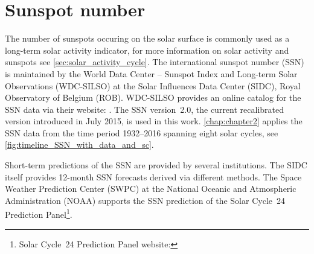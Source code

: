 \section{Sunspot number}
\label{sec:sunspot_number}
The number of sunspots occuring on the solar surface is commonly used as a long-term solar activity indicator, for more information on solar activity and sunspots see \autoref{sec:solar_activity_cycle}. The international sunspot number (SSN) is maintained by the World Data Center -- Sunspot Index and Long-term Solar Observations (WDC-SILSO) at the Solar Influences Data Center (SIDC), Royal Observatory of Belgium (ROB). WDC-SILSO provides an online catalog for the SSN data via their website: . The SSN version~2.0, the current recalibrated version introduced in July 2015, is used in this work. \autoref{chap:chapter2} applies the SSN data from the time period 1932--2016 spanning eight solar cycles, see \autoref{fig:timeline_SSN_with_data_and_sc}.

Short-term predictions of the SSN are provided by several institutions. The SIDC itself provides 12-month SSN forecasts derived via different methods. The Space Weather Prediction Center (SWPC) at the National Oceanic and Atmospheric Administration (NOAA) supports the SSN prediction of the Solar Cycle~24 Prediction Panel\footnote{Solar Cycle~24 Prediction Panel website: }.


